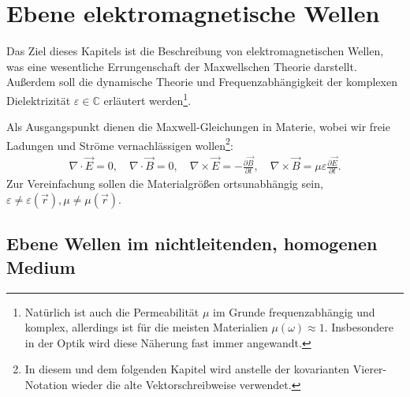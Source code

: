 


\chapter{Ebene elektromagnetische Wellen}


Das Ziel dieses Kapitels ist die Beschreibung von elektromagnetischen Wellen, was eine wesentliche Errungenschaft der Maxwellschen Theorie darstellt.
Außerdem soll die dynamische Theorie und Frequenzabhängigkeit der komplexen Dielektrizität $\varepsilon\in\mathbb{C}$ erläutert werden\footnote{Natürlich ist auch die Permeabilität $\mu$ im Grunde frequenzabhängig und komplex, allerdings ist für die meisten Materialien $\mu(\omega)\approx 1$. Insbesondere in der Optik wird diese Näherung fast immer angewandt. }.

Als Ausgangspunkt dienen die Maxwell-Gleichungen in Materie, wobei wir freie Ladungen und Ströme vernachlässigen wollen\footnote{In diesem und dem folgenden Kapitel wird anstelle der kovarianten Vierer-Notation wieder die alte Vektorschreibweise verwendet.}:
\begin{align}
    \nabla\cdot\vec E=0,\quad \nabla\cdot\vec B=0, \quad \nabla\times \vec E=-\frac{\partial\vec B}{\partial t}, \quad \nabla\times \vec B=\mu\varepsilon \frac{\partial\vec E}{\partial t}.
\end{align}
Zur Vereinfachung sollen die Materialgrößen ortsunabhängig sein, $\varepsilon\neq\varepsilon(\vec r),\mu\neq\mu(\vec r)$.




\section{Ebene Wellen im nichtleitenden, homogenen Medium}

